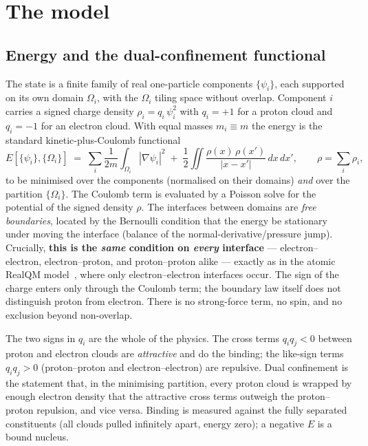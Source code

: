 \documentclass[11pt]{article}
\begin{document}
\section{The model}

\subsection{Energy and the dual-confinement functional}

The state is a finite family of real one-particle components $\{\psi_i\}$, each supported on
its own domain $\Omega_i$, with the $\Omega_i$ tiling space without overlap. Component $i$
carries a signed charge density $\rho_i = q_i\,\psi_i^2$ with $q_i=+1$ for a proton cloud and
$q_i=-1$ for an electron cloud. With equal masses $m_i\equiv m$ the energy is the standard
kinetic-plus-Coulomb functional
\begin{equation}
E[\{\psi_i\},\{\Omega_i\}]
 \;=\; \sum_i \frac{1}{2m}\int_{\Omega_i}|\nabla\psi_i|^2
 \;+\; \frac12\iint \frac{\rho(x)\,\rho(x')}{|x-x'|}\,dx\,dx',
 \qquad \rho=\sum_i \rho_i ,
\label{eq:energy}
\end{equation}
to be minimised over the components (normalised on their domains) \emph{and} over the partition
$\{\Omega_i\}$. The Coulomb term is evaluated by a Poisson solve for the potential of the
signed density $\rho$. The interfaces between domains are \emph{free boundaries}, located by
the Bernoulli condition that the energy be stationary under moving the interface (balance of
the normal-derivative/pressure jump). Crucially, \textbf{this is the \emph{same} condition on
\emph{every} interface} --- electron--electron, electron--proton, and proton--proton alike ---
exactly as in the atomic RealQM model~\cite{Johnson-Atoms}, where only electron--electron
interfaces occur. The sign of the charge enters only through the Coulomb term; the boundary
law itself does not distinguish proton from electron. There is no strong-force term, no spin,
and no exclusion beyond non-overlap.

The two signs in $q_i$ are the whole of the physics. The cross terms $q_iq_j<0$ between proton
and electron clouds are \emph{attractive} and do the binding; the like-sign terms $q_iq_j>0$
(proton--proton and electron--electron) are repulsive. Dual confinement is the statement that,
in the minimising partition, every proton cloud is wrapped by enough electron density that the
attractive cross terms outweigh the proton--proton repulsion, and vice versa. Binding is
measured against the fully separated constituents (all clouds pulled infinitely apart, energy
zero); a negative $E$ is a bound nucleus.
\end{document}
